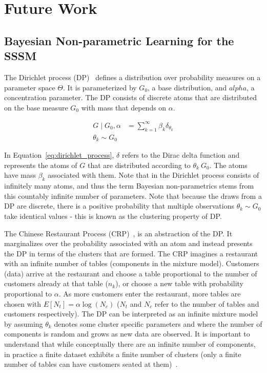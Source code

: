 \section{Future Work}
\subsection{Bayesian Non-parametric Learning for the SSSM}\label{sec:non-parameteric}
The Dirichlet process (DP)~\cite{ferguson1973bayesian} defines a distribution over probability measures on a parameter space $\Theta$. It is parameterized by $G_0$, a base distribution, and $alpha$, a concentration parameter. The DP consists of discrete atoms that are distributed on the base measure $G_0$ with mass that depends on $\alpha$.

\begin{equation}\label{eq:dirichlet_process}
  \begin{split}
    G \mid G_0, \alpha &= \sum\limits_{k=1}^{\infty} \beta_k \delta_{\theta_k} \\
    \theta_k \sim G_0
  \end{split}
\end{equation}

In Equation~\ref{eq:dirichlet_process}, $\delta$ refers to the Dirac delta function and represents the atoms of $G$ that are distributed according to $\theta_k ~ G_0$. The atoms have mass $\beta_k$ associated with them. Note that in the Dirichlet process consists of infinitely many atoms, and thus the term Bayesian non-parametrics stems from this countably infinite number of parameters. Note that because the draws from a DP are discrete, there is a positive probability that multiple observations $\theta_k \sim G_0$ take identical values - this is known as the clustering property of DP.

The Chinese Restaurant Process (CRP)~\citep{neal2000markov, gershman2012tutorial}, is an abstraction of the DP. It marginalizes over the probability associated with an atom and instead presents the DP in terms of the clusters that are formed. The CRP imagines a restaurant with an infinite number of tables (components in the mixture model). Customers (data) arrive at the restaurant and choose a table proportional to the number of customers already at that table ($n_k$), or choose a new table with probability proportional to $\alpha$. As more customers enter the restaurant, more tables are chosen with $E[N_t] = \alpha \log(N_c)$ ($N_t$ and $N_c$ refer to the number of tables and customers respectively). The DP can be interpreted as an infinite mixture model by assuming $\theta_k$ denotes some cluster specific parameters and where the number of components is random and grows as new data are observed. It is important to understand that while conceptually there are an infinite number of components, in practice a finite dataset exhibits a finite number of clusters (only a finite number of tables can have customers seated at them)~\citep{blei2006variational}.

